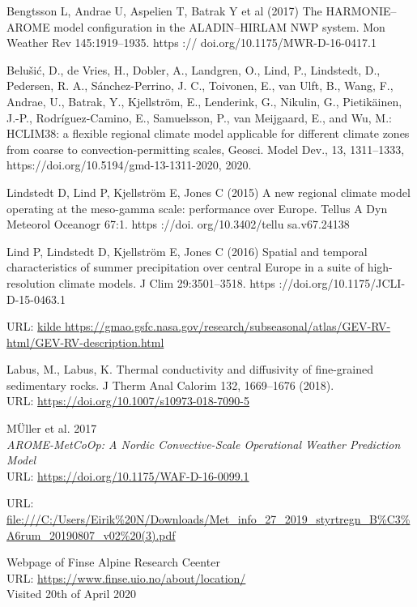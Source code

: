 \begin{thebibliography}{9}
Bengtsson L, Andrae U, Aspelien T, Batrak Y et al (2017) The HARMONIE–
AROME model configuration in the ALADIN–HIRLAM
NWP system. Mon Weather Rev 145:1919–1935. https ://
doi.org/10.1175/MWR-D-16-0417.1

Belušić, D., de Vries, H., Dobler, A., Landgren, O., Lind, P., Lindstedt, D., Pedersen, R. A., Sánchez-Perrino, J. C., Toivonen, E., van Ulft, B., Wang, F., Andrae, U., Batrak, Y., Kjellström, E., Lenderink, G., Nikulin, G., Pietikäinen, J.-P., Rodríguez-Camino, E., Samuelsson, P., van Meijgaard, E., and Wu, M.: HCLIM38: a flexible regional climate model applicable for different climate zones from coarse to convection-permitting scales, Geosci. Model Dev., 13, 1311–1333, https://doi.org/10.5194/gmd-13-1311-2020, 2020.

Lindstedt D, Lind P, Kjellström E, Jones C (2015) A new regional
climate model operating at the meso-gamma scale: performance
over Europe. Tellus A Dyn Meteorol Oceanogr 67:1. https ://doi.
org/10.3402/tellu sa.v67.24138

Lind P, Lindstedt D, Kjellström E, Jones C (2016) Spatial and temporal
characteristics of summer precipitation over central Europe in a
suite of high-resolution climate models. J Clim 29:3501–3518.
https ://doi.org/10.1175/JCLI-D-15-0463.1

URL: \url{kilde https://gmao.gsfc.nasa.gov/research/subseasonal/atlas/GEV-RV-html/GEV-RV-description.html}

Labus, M., Labus, K. Thermal conductivity and diffusivity of fine-grained sedimentary rocks. J Therm Anal Calorim 132, 1669–1676 (2018). \\
URL: \url{https://doi.org/10.1007/s10973-018-7090-5}

MÜller et al. 2017\\
\textit{AROME-MetCoOp: A Nordic Convective-Scale Operational
Weather Prediction Model}\\
URL: \url{https://doi.org/10.1175/WAF-D-16-0099.1}

URL: \url{file:///C:/Users/Eirik%20N/Downloads/Met_info_27_2019_styrtregn_B%C3%A6rum_20190807_v02%20(3).pdf}

Webpage of Finse Alpine Research Ceenter\\
URL: \url{https://www.finse.uio.no/about/location/}\\
Visited 20th of April 2020


\end{thebibliography}
